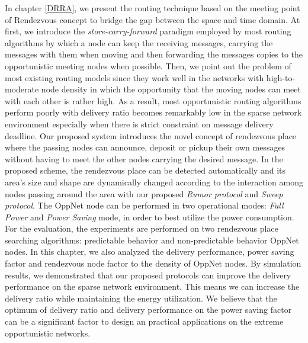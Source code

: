 In chapter \ref{DRRA}, we present the routing technique based on the meeting point of Rendezvous concept to bridge the gap between the space and time domain.
At first, we introduce the \textit{store-carry-forward} paradigm employed by most routing algorithms by which a node can keep the receiving messages, carrying the messages with them when moving and then forwarding the messages copies to the opportunistic meeting nodes when possible.
Then, we point out the problem of most existing routing models since they work well in the networks with high-to-moderate node density in which the opportunity that the moving nodes can meet with each other is rather high.
As a result, most opportunistic routing algorithms perform poorly with delivery ratio becomes remarkably low in the sparse network environment especially when there is strict constraint on message delivery deadline.
Our proposed system introduces the novel concept of rendezvous place where the passing nodes can announce, deposit or pickup their own messages without having to meet the other nodes carrying the desired message.
In the proposed scheme, the rendezvous place can be detected automatically and its area's size and shape are dynamically changed according to the interaction among nodes passing around the area with our proposed \emph{Rumor protocol} and \emph{Sweep protocol}.
The OppNet node can be performed in two operational modes: \emph{Full Power} and \emph{Power Saving} mode, in order to best utilize the power consumption.
For the evaluation, the experiments are performed on two rendezvous place searching algorithms: predictable behavior and non-predictable behavior OppNet nodes.
In this chapter, we also analyzed the delivery performance, power saving factor and rendezvous node factor to the density of OppNet nodes.
By simulation results, we demonstrated that our proposed protocols can improve the delivery performance on the sparse network environment.
This means we can increase the delivery ratio while maintaining the energy utilization.
We believe that the optimum of delivery ratio and delivery performance on the power saving factor can be a significant factor to design an practical applications on the extreme opportunistic networks.


